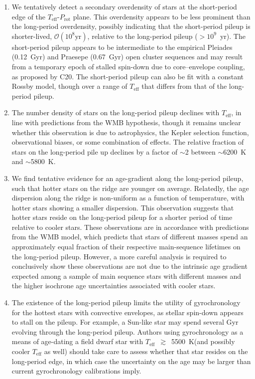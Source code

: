 \documentclass[trackchanges,twocolumn]{aastex631}
\newcommand{\teffmin}{5500~K\xspace}
\newcommand{\curtis}{C20\xspace}
\newcommand{\teff}{\ensuremath{T_{\mathrm{eff}}}\xspace}
\newcommand{\prot}{\ensuremath{P_\mathrm{rot}}\xspace}
\begin{document}
\begin{enumerate}
    \item We tentatively detect a secondary overdensity of stars at the short-period edge of the \teff-\prot plane. This overdensity appears to be less prominent than the long-period overdensity, possibly indicating that the short-period pileup is shorter-lived, $\mathcal{O}(10^8 \text{yr})$, relative to the long-period pileup ($>10^9$~yr). The short-period pileup appears to be intermediate to the empirical Pleiades (0.12~Gyr) and Praesepe (0.67~Gyr) open cluster sequences and may result from a temporary epoch of stalled spin-down due to core–envelope coupling, as proposed by \curtis. The short-period pileup can also be fit with a constant Rossby model, though over a range of \teff that differs from that of the long-period pileup.
    
    \item The number density of stars on the long-period pileup declines with \teff, in line with predictions from the WMB hypothesis, though it remains unclear whether this observation is due to astrophysics, the Kepler selection function, observational biases, or some combination of effects. The relative fraction of stars on the long-period pile up declines by a factor of $\sim$2 between $\sim$6200~K and $\sim$5800~K. 
    
    \item We find tentative evidence for an age-gradient along the long-period pileup, such that hotter stars on the ridge are younger on average. Relatedly, the age dispersion along the ridge is non-uniform as a function of temperature, with hotter stars showing a smaller dispersion. This observation suggests that hotter stars reside on the long-period pileup for a shorter period of time relative to cooler stars. These observations are in accordance with predictions from the WMB model, which predicts that stars of different masses spend an approximately equal fraction of their respective main-sequence lifetimes on the long-period pileup. However, a more careful analysis is required to conclusively show these observations are not due to the intrinsic age gradient expected among a sample of main sequence stars with different masses and the higher isochrone age uncertainties associated with cooler stars.
    
    \item The existence of the long-period pileup limits the utility of gyrochronology for the hottest stars with convective envelopes, as stellar spin-down appears to stall on the pileup. For example, a Sun-like star may spend several Gyr evolving through the long-period pileup. Authors using gyrochronology as a means of age-dating a field dwarf star with \teff~$\gtrsim$~\teffmin (and possibly cooler \teff as well) should take care to assess whether that star resides on the long-period edge, in which case the uncertainty on the age may be larger than current gyrochronology calibrations imply.
    

\end{enumerate}
\end{document}
